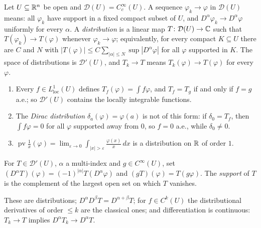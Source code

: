 \begin{definition}\label{distributions:definition-distribution}
Let $U \subseteq \mathbb{R}^n$ be open and $\mathcal{D}(U) = C_c^\infty(U)$. A sequence $\varphi_k \to \varphi$ in $\mathcal{D}(U)$ means: all $\varphi_k$ have support in a fixed compact subset of $U$, and
$D^\alpha\varphi_k \to D^\alpha\varphi$ uniformly for every $\alpha$. A \emph{distribution} is a linear map $T \colon \mathcal{D}(U) \to \mathbb{C}$ such that $T(\varphi_k) \to T(\varphi)$ whenever
$\varphi_k \to \varphi$; equivalently, for every compact $K \subseteq U$ there are $C$ and $N$ with $|T(\varphi)| \leq C\sum_{|\alpha| \leq N}\sup|D^\alpha\varphi|$ for all $\varphi$ supported in $K$. The space of
distributions is $\mathcal{D}'(U)$, and $T_k \to T$ means $T_k(\varphi) \to T(\varphi)$ for every $\varphi$.
\end{definition}

\begin{example}\label{distributions:example-distributions}
\begin{enumerate}
\item Every $f \in L^1_{\mathrm{loc}}(U)$ defines $T_f(\varphi) = \int f\varphi$, and $T_f = T_g$ if and only if $f = g$ a.e.; so $\mathcal{D}'(U)$ contains the locally integrable functions.
\item The \emph{Dirac distribution} $\delta_a(\varphi) = \varphi(a)$ is not of this form: if $\delta_0 = T_f$, then $\int f\varphi = 0$ for all $\varphi$ supported away from $0$, so $f = 0$ a.e., while
$\delta_0 \neq 0$.
\item $\operatorname{pv}\frac1x(\varphi) = \lim_{\varepsilon \to 0}\int_{|x| > \varepsilon}\frac{\varphi(x)}{x}\,dx$ is a distribution on $\mathbb{R}$ of order $1$.
\end{enumerate}
\end{example}

\begin{definition}\label{distributions:definition-derivative}
For $T \in \mathcal{D}'(U)$, $\alpha$ a multi-index and $g \in C^\infty(U)$, set $(D^\alpha T)(\varphi) = (-1)^{|\alpha|}T(D^\alpha\varphi)$ and $(gT)(\varphi) = T(g\varphi)$. The \emph{support} of $T$ is the
complement of the largest open set on which $T$ vanishes.
\end{definition}

\begin{proposition}\label{distributions:proposition-derivative}
These are distributions; $D^\alpha D^\beta T = D^{\alpha+\beta}T$; for $f \in C^k(U)$ the distributional derivatives of order $\leq k$ are the classical ones; and differentiation is continuous: $T_k \to T$
implies $D^\alpha T_k \to D^\alpha T$.
\end{proposition}

